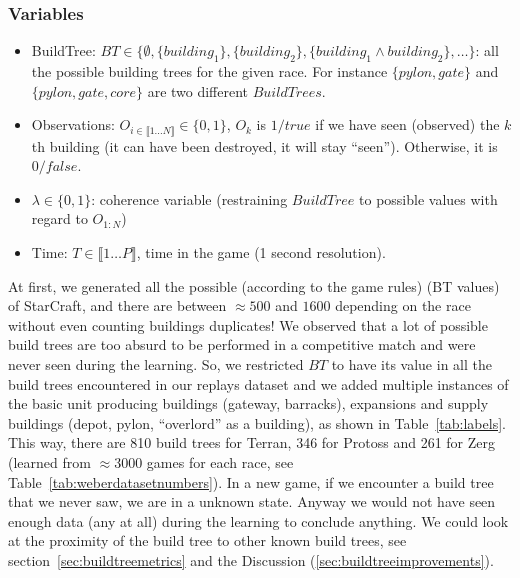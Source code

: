 \subsubsection{Variables}
\begin{itemize}
\item BuildTree: $BT \in \{\emptyset, \{building_1\}, \{building_2\}, \{building_1\wedge building_2\}, \dots\}$: all the possible building trees for the given race. For instance $\{pylon, gate\}$ and $\{pylon, gate, core\}$ are two different $BuildTrees$.
\item Observations: $O_{i \in \llbracket 1\dots N \rrbracket} \in \{0, 1\}$, $O_k$ is $1/true$ if we have seen (observed) the $k$th building (it can have been destroyed, it will stay ``seen''). Otherwise, it is $0/false$.
\item $\lambda \in \{0, 1\}$: coherence variable (restraining $BuildTree$ to possible values with regard to $O_{1:N}$)
\item Time: $T \in \llbracket 1\dots P \rrbracket$, time in the game (1 second resolution).
\end{itemize}

At first, we generated all the possible (according to the game rules)  (BT values) of StarCraft, and there are between $\approx 500$ and $1600$ depending on the race without even counting buildings duplicates! We observed that a lot of possible build trees are too absurd to be performed in a competitive match and were never seen during the learning. So, we restricted $BT$ to have its value in all the build trees encountered in our replays dataset and we added multiple instances of the basic unit producing buildings (gateway, barracks), expansions and supply buildings (depot, pylon, ``overlord'' as a building), as shown in Table~\ref{tab:labels}. 
This way, there are 810 build trees for Terran, 346 for Protoss and 261 for Zerg (learned from $\approx 3000$ games for each race, see Table~\ref{tab:weberdatasetnumbers}). In a new game, if we encounter a build tree that we never saw, we are in a unknown state. Anyway we would not have seen enough data (any at all) during the learning to conclude anything. We could look at the proximity of the build tree to other known build trees, see section~\ref{sec:buildtreemetrics} and the Discussion (\ref{sec:buildtreeimprovements}).

